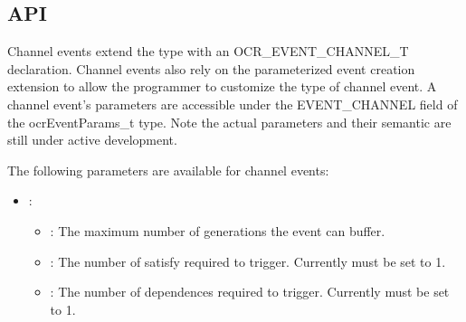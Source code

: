 \subsection{API}

Channel events extend the
\hypertarget{type_ocrEventTypes_t}{} type
with an OCR\_EVENT\_CHANNEL\_T declaration. Channel events also rely
on the parameterized event creation extension to allow the programmer
to customize the type of channel event. A channel event's parameters are
accessible under the EVENT\_CHANNEL field of the ocrEventParams\_t
type. Note the actual parameters and their semantic are still under
active development.

The following parameters are available for channel events:
\begin{itemize}
\item {}:
\begin{itemize}
\item {}: The maximum number of generations the event can buffer.
\item {}: The number of satisfy required to trigger.
  Currently must be set to 1.
\item {}: The number of dependences required to
  trigger. Currently must be set to 1.
\end{itemize}
\end{itemize}
